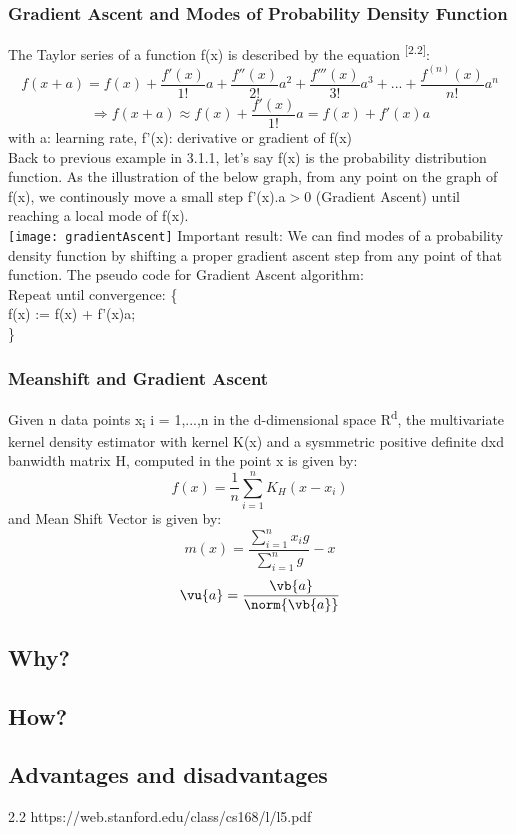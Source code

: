 \subsubsection{Gradient Ascent and Modes of Probability Density Function}
The Taylor series of a function f(x) is described by the equation \textsuperscript{[2.2]}:
\[
    f(x+a) = f(x) + \frac{f'(x)}{1!}a+\frac{f''(x)}{2!}a^2+\frac{f'''(x)}{3!}a^3+...+\frac{f^{(n)}(x)}{n!}a^n
\]
\[\Longrightarrow f(x+a) \approx f(x) + \frac{f'(x)}{1!}a =  f(x) + f'(x)a\]
with a: learning rate,  f'(x): derivative or gradient of f(x)\\
Back to previous example in 3.1.1, let's say f(x) is the probability distribution function. As the illustration of the below graph, from any point on the graph of f(x), we continously move a small step f'(x).a$>$0 (Gradient Ascent) until reaching a local mode of f(x).\\ 
\texttt{[image: gradientAscent]}
Important result: We can find modes of a probability density function by shifting a proper gradient ascent step from any point of that function.
The pseudo code for Gradient Ascent algorithm:\\
Repeat until convergence: \{\\
f(x) := f(x) + f'(x)a;\\
\}
\subsubsection{Meanshift and Gradient Ascent}

Given n data points x\textsubscript{i} i = 1,...,n in the d-dimensional space R\textsuperscript{d}, the multivariate kernel density estimator with kernel K(x) and a sysmmetric positive definite dxd banwidth matrix H, computed in the point x is given by:
	\[f(x) = \frac{1}{n}\sum_{i=1}^{n}K_H(x-x_i)\]
and Mean Shift Vector is given by:
	\[m(x) = \frac{\sum_{i=1}^{n}x_ig}{\sum_{i=1}^{n}g}-x\]
	 \[ \vu{a} = \frac{\vb{a}}{\norm{\vb{a}}} \]
\subsection{Why?}

\subsection{How?}

\subsection{Advantages and disadvantages}

2.2 https://web.stanford.edu/class/cs168/l/l5.pdf